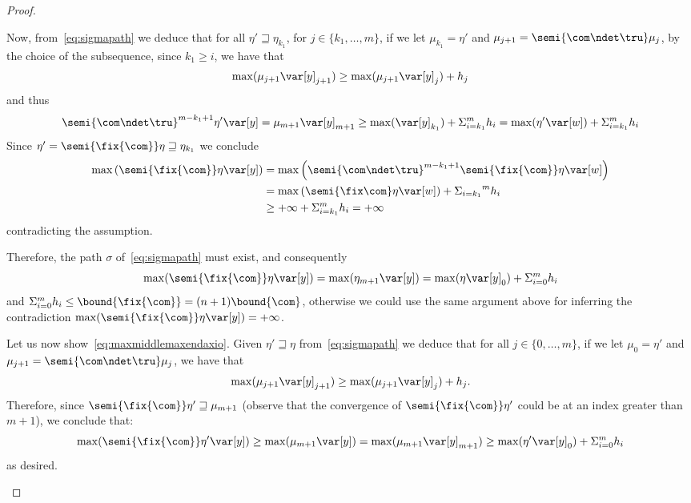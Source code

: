 \begin{proof}
\begin{inductive}
    Now, from~\eqref{eq:sigmapath} we deduce that for all
    \(\eta' \sqsupseteq \eta_{k_1}\), for \(j \in \{ k_1, \ldots, m\}\),
    if we let \(\mu_{k_1} = \eta'\) and
    \(\mu_{j+1} = \semi{\com \ndet \tru} \mu_j\), by the choice of the
    subsequence, since \(k_1 \geq i\), we have that
    \[\max(\mu_{j+1} \var[y]_{j+1}) \geq \max(\mu_{j+1} \var[y]_{j}) +
      h_j\] and thus
    \[
      \semi{\com \ndet \tru}^{m-k_1+1} \eta' \var[y] = \mu_{m+1}
      \var[y]_{m+1} \geq 
      \max(\var[y]_{k_1}) + \Sigma_{i=k_1}^m h_i = \max(\eta' \var[w]) + \Sigma_{i=k_1}^m h_i
    \]
    Since \(\eta' = \semi{\fix{\com}} \eta \sqsupseteq \eta_{k_1}\) we conclude
    \begin{align*}
      \max\left({\semi{\fix{\com}} \eta \var[y]}\right) & = \max\left({\semi{\com \ndet \tru}^{m-k_1+1} \semi{\fix{\com}} \eta \var[w]}\right)\\
                                                        & = \max\left(\semi{\fix\com}\eta\var[w]\right) + {\Sigma_{i=k_1}}^m{h_i} \\
                                                        & \geq +\infty + \Sigma_{i=k_1}^m h_i = +\infty
    \end{align*}
    contradicting the assumption.
    
    \noindent
    Therefore, the path \(\sigma\) of~\eqref{eq:sigmapath} must exist, and
    consequently
    \[\max(\semi{\fix{\com}} \eta \var[y]) = \max(\eta_{m+1} \var[y]) =
      \max(\eta \var[y]_0) + \Sigma_{i=0}^m h_i\] and
    \(\Sigma_{i=0}^m h_i \leq \bound{\fix{\com}}=(n+1)\bound{\com}\),
    otherwise we could use the same argument above for inferring the
    contradiction \(\max(\semi{\fix{\com}} \eta \var[y]) = +\infty\).

    \medskip

    Let us now show\ \eqref{eq:maxmiddlemaxendaxio}. Given
    \(\eta' \sqsupseteq \eta\) from\ \eqref{eq:sigmapath} we deduce that for
    all \(j \in \{ 0, \ldots, m\}\), if we let \(\mu_0 = \eta'\) and
    \(\mu_{j+1} = \semi{\com \ndet \tru} \mu_j\), we have that
    \[
      \max(\mu_{j+1} \var[y]_{j+1}) \geq \max(\mu_{j+1} \var[y]_{j}) +
      h_j. \]
    Therefore, since \(\semi{\fix{\com}} \eta' \sqsupseteq \mu_{m+1}\)
    (observe that the convergence of \(\semi{\fix{\com}} \eta' \) could
    be at an index greater than \(m+1\)), we conclude that:
    \[\max(\semi{\fix{\com}} \eta' \var[y]) \geq \max(\mu_{m+1}
      \var[y]) = \max(\mu_{m+1} \var[y]_{m+1}) \geq \max(\eta' \var[y]_0)
      + \Sigma_{i=0}^m h_i\] as desired.
  \end{inductive}
\end{proof}

